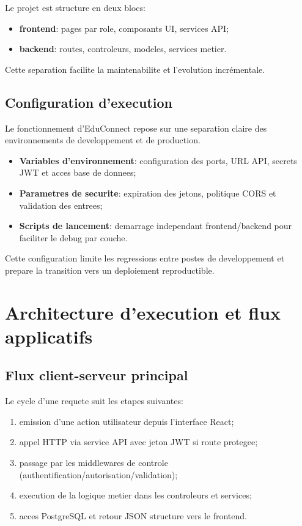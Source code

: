 ﻿\documentclass[12pt,a4paper,oneside]{report}
\begin{document}
Le projet est structure en deux blocs:
\begin{itemize}
  \item \textbf{frontend}: pages par role, composants UI, services API;
  \item \textbf{backend}: routes, controleurs, modeles, services metier.
\end{itemize}

Cette separation facilite la maintenabilite et l'evolution incrémentale.

\subsection{Configuration d'execution}

Le fonctionnement d'EduConnect repose sur une separation claire des environnements de developpement et de production.
\begin{itemize}
  \item \textbf{Variables d'environnement}: configuration des ports, URL API, secrets JWT et acces base de donnees;
  \item \textbf{Parametres de securite}: expiration des jetons, politique CORS et validation des entrees;
  \item \textbf{Scripts de lancement}: demarrage independant frontend/backend pour faciliter le debug par couche.
\end{itemize}

Cette configuration limite les regressions entre postes de developpement et prepare la transition vers un deploiement reproductible.

\section{Architecture d'execution et flux applicatifs}

\subsection{Flux client-serveur principal}

Le cycle d'une requete suit les etapes suivantes:
\begin{enumerate}
  \item emission d'une action utilisateur depuis l'interface React;
  \item appel HTTP via service API avec jeton JWT si route protegee;
  \item passage par les middlewares de controle (authentification/autorisation/validation);
  \item execution de la logique metier dans les controleurs et services;
  \item acces PostgreSQL et retour JSON structure vers le frontend.
\end{enumerate}
\end{document}
